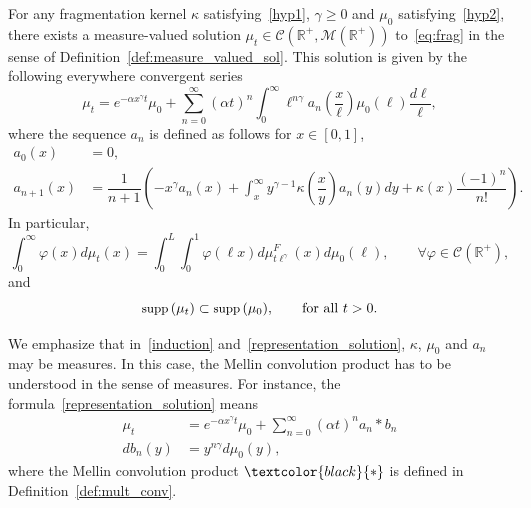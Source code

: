 \documentclass[AHL,Unicode,longabstracts,published]{cedram}
\newcommand*\dst{\displaystyle}
\renewcommand*\a{\alpha}
\newcommand*\R{\mathbb{R}}
\newcommand*\M{\mathcal{M}}
\newcommand{\clC}{\mathcal{C}}
\newcommand{\MT}[1]{\textcolor{black}{#1}}
\newcommand*\supp{{\mbox{\small\rm supp}}\,}
\let\oldforall\forall
\renewcommand*{\forall}{\mathrel{\oldforall}}
\begin{document}
\begin{theo}\label{thm:power_serie}
For any fragmentation kernel $\kappa $ satisfying~\eqref{hyp1}, $\gamma\geq 0$ and $\mu_0$ satisfying~\eqref{hyp2}, there exists a measure-valued solution $\mu_t\in\clC(\R^+,\M(\R^+))$ to~\eqref{eq:frag} in the sense of Definition~\ref{def:measure_valued_sol}. This solution is given by the following everywhere convergent series
\begin{equation}\label{representation_solution}
\mu_t = e^{-\a x^{\gamma}t} \mu_0 + \sum_{n=0}^{\infty} (\a t)^n
\dst\int_0^{\infty} \ell^{n\gamma}a_n\left(\dfrac{x}{\ell}\right)\mu_0(\ell) \dfrac{d\ell}\ell{},
\end{equation}
where the sequence $a_n$ is defined as follows for $x\in [0,1]$,
\begin{equation}\label{induction}
\begin{split}
a_0(x) &=0, \\
 a_{n+1}(x) &= \dfrac{1}{n+1}\left(-x^{\gamma}a_n(x)+ \dst\int_x^{\infty} y^{\gamma-1} \kappa \left(\dfrac{x}{y} \right)a_n(y)dy + \kappa(x) \dfrac{(-1)^n}{n!}\right).
\end{split}
\end{equation}
In particular,
\begin{equation}\label{weakform}
\dst\int_0^{\infty} \varphi(x) d\mu_t(x) = \dst\int_0^{L} \dst\int_0^{1} \varphi(\ell x) d \mu_{t\ell^{\gamma}}^{F} (x)d\mu_0(\ell),\qquad \forall \varphi\in \clC(\R^+),
\end{equation}
and
\begin{equation}
\supp(\mu_t)\subset \supp(\mu_0), \qquad \text{for all } t>0.
\end{equation}

\end{theo}



\begin{rema}\label{remark1}
We emphasize that in~\eqref{induction} and~\eqref{representation_solution}, $\kappa$, $\mu_0$ and $a_n$ may be measures. In this case, the Mellin convolution product has to be understood in the sense of measures. For instance, the formula~\eqref{representation_solution} means
\begin{align}
\mu_t &= e^{-\a x^{\gamma}t} \mu_0 + \sum_{n=0}^{\infty} (\a t)^n a_n \ast b_n \label{remark1E1}
\\
 db_n(y) &=y^{n\gamma } d\mu _0(y), \label{remark1E2}
\end{align}
where the Mellin convolution product $\MT{\ast}$ is defined in Definition~\ref{def:mult_conv}.
\end{rema}
\end{document}
